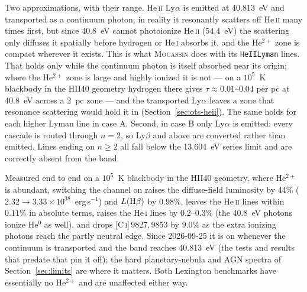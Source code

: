 \documentclass[english,a4paper]{my_memo}
\newcommand{\code}[1]{\texttt{#1}}
\begin{document}
Two approximations, with their range.  He\,\textsc{ii} Ly$\alpha$ is emitted
at 40.813~eV and transported as a continuum photon; in reality it resonantly
scatters off He\,\textsc{ii} many times first, but since 40.8~eV cannot
photoionize He\,\textsc{ii} (54.4~eV) the scattering only diffuses it
spatially before hydrogen or He\,\textsc{i} absorbs it, and the He$^{2+}$
zone is compact wherever it exists.  This is what \textsc{Mocassin} does with
its \code{HeIILyman} lines.  That holds only while the continuum photon is
itself absorbed near its origin; where the He$^{2+}$ zone is large and
highly ionized it is not --- on a $10^5$~K blackbody in the HII40 geometry
hydrogen there gives $\tau\approx0.01$--$0.04$ per pc at 40.8~eV across a
2~pc zone --- and the transported Ly$\alpha$ leaves a zone that resonance
scattering would hold it in (Section~\ref{sec:ots-heii}).  The same holds
for each higher Lyman line in case A.  Second, in case B only Ly$\alpha$ is
emitted: every cascade is routed through $n=2$, so Ly$\beta$ and above are
converted rather than emitted.  Lines ending on $n\ge2$ all fall below the
13.604~eV series limit and are correctly absent from the band.

Measured end to end on a $10^5$~K blackbody in the HII40 geometry, where
He$^{2+}$ is abundant, switching the channel on raises the diffuse-field
luminosity by 44\% ($2.32 \rightarrow 3.33{\times}10^{38}$~erg\,s$^{-1}$) and
$L({\rm H}\beta)$ by $0.98\%$, leaves the He\,\textsc{ii} lines within
$0.11\%$ in absolute terms, raises the He\,\textsc{i} lines by $0.2$--$0.3\%$ (the
40.8~eV photons ionize He$^0$ as well), and drops
[C\,\textsc{i}]\,9827,\,9853 by $9.0\%$ as the extra ionizing photons reach
the partly neutral edge.  Since 2026-09-25 it is on whenever the continuum
is transported and the band reaches 40.813~eV (the tests and results that
predate that pin it off); the hard planetary-nebula and AGN spectra of
Section~\ref{sec:limits} are where it matters.  Both Lexington benchmarks
have essentially no He$^{2+}$ and are unaffected either way.
\end{document}
